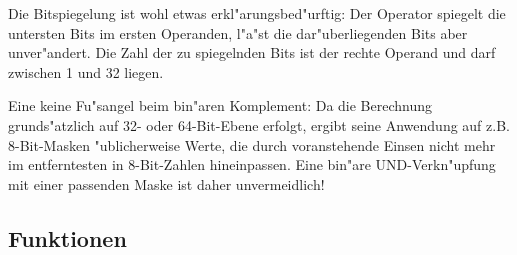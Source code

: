 \documentclass[12pt,a4paper,twoside]{report}
\begin{document}
\par
Die Bitspiegelung ist wohl etwas erkl"arungsbed"urftig: Der Operator
spiegelt die untersten Bits im ersten Operanden, l"a"st die
dar"uberliegenden Bits aber unver"andert.  Die Zahl der zu spiegelnden
Bits ist der rechte Operand und darf zwischen 1 und 32 liegen.
\par
Eine keine Fu"sangel beim bin"aren Komplement: Da die Berechnung
grunds"atzlich auf 32- oder 64-Bit-Ebene erfolgt, ergibt seine Anwendung
auf z.B. 8-Bit-Masken "ublicherweise Werte, die durch voranstehende
Einsen nicht mehr im entferntesten in 8-Bit-Zahlen hineinpassen.  Eine
bin"are UND-Verkn"upfung mit einer passenden Maske ist daher unvermeidlich!

\subsection{Funktionen}
\end{document}
